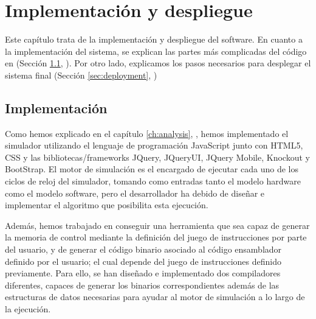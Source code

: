 \chead[]{}
\renewcommand{\headrulewidth}{0.5pt}

\lfoot[]{}
\cfoot[]{}
\rfoot[]{}
\renewcommand{\footrulewidth}{0pt}

\chapter{Implementación y despliegue}
\label{ch:implementation_and_deployment}


Este capítulo trata de la implementación y despliegue del software. En cuanto a la implementación del sistema, se explican las partes más complicadas del código en (Sección  \ref{sec:implementation}, \textit{}). Por otro lado, explicamos los pasos necesarios para desplegar el sistema final (Sección \ref{sec:deployment}, \textit{})


\section{Implementación}
\label{sec:implementation}


Como hemos explicado en el capítulo \ref{ch:analysis}, \textit{}, hemos implementado el simulador utilizando el lenguaje de programación JavaScript junto con HTML5, CSS y las bibliotecas/frameworks JQuery, JQueryUI, JQuery Mobile, Knockout y BootStrap. El motor de simulación es el encargado de ejecutar cada uno de los ciclos de reloj del simulador, tomando como entradas tanto el modelo hardware como el modelo software, pero el desarrollador ha debido de diseñar e implementar el algoritmo que posibilita esta ejecución.

Además, hemos trabajado en conseguir una herramienta que sea capaz de generar la memoria de control mediante la definición del juego de instrucciones por parte del usuario, y de generar el código binario asociado al código ensamblador definido por el usuario; el cual depende del juego de instrucciones definido previamente. Para ello, se han diseñado e implementado dos compiladores diferentes, capaces de generar los binarios correspondientes además de las estructuras de datos necesarias para ayudar al motor de simulación a lo largo de la ejecución.

